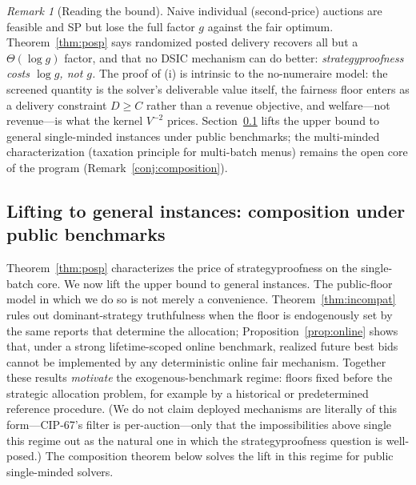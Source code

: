 \documentclass[11pt]{article}
\theoremstyle{remark}
\newtheorem{remark}{Remark}
\begin{document}
\begin{remark}[Reading the bound]\label{rem:pospreading}
Naive individual (second-price) auctions are feasible and SP but lose the
full factor $g$ against the fair optimum. Theorem~\ref{thm:posp} says
randomized posted delivery recovers all but a $\Theta(\log g)$ factor, and
that no DSIC mechanism can do better: \emph{strategyproofness costs
$\log g$, not $g$.} The proof of (i) is intrinsic to the no-numeraire
model: the screened quantity is the solver's deliverable value itself, the
fairness floor enters as a delivery constraint $D\ge C$ rather than a
revenue objective, and welfare---not revenue---is what the kernel
$V^{-2}$ prices. Section~\ref{sec:composition} lifts the upper bound to general
single-minded instances under public benchmarks; the multi-minded
characterization (taxation principle for multi-batch menus) remains the
open core of the program (Remark~\ref{conj:composition}).
\end{remark}

\subsection{Lifting to general instances: composition under public
benchmarks}\label{sec:composition}

Theorem~\ref{thm:posp} characterizes the price of strategyproofness on the
single-batch core. We now lift the upper bound to general instances. The
public-floor model in which we do so is not merely a convenience.
Theorem~\ref{thm:incompat} rules out dominant-strategy truthfulness when
the floor is endogenously set by the same reports that determine the
allocation; Proposition~\ref{prop:online} shows that, under a strong
lifetime-scoped online benchmark, realized future best bids cannot be
implemented by any deterministic online fair mechanism. Together these
results \emph{motivate} the exogenous-benchmark regime: floors fixed
before the strategic allocation problem, for example by a historical or
predetermined reference procedure. (We do not claim deployed mechanisms
are literally of this form---CIP-67's filter is per-auction---only that
the impossibilities above single this regime out as the natural one in
which the strategyproofness question is well-posed.) The composition
theorem below solves the lift in this regime for public single-minded
solvers.
\end{document}
